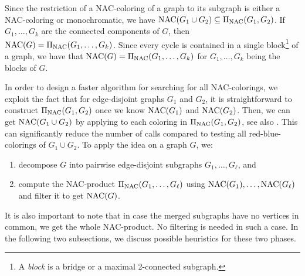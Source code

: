
Since the restriction of a NAC-coloring of a graph
to its subgraph is either a NAC-coloring or monochromatic,
we have $\operatorname{NAC}(G_{1} \cup G_{2}) \subseteq \operatorname{\Pi_{\operatorname{NAC}}}(G_{1}, G_{2})$.
If $G_1, \dots, G_k$ are the connected components of $G$,
then $\operatorname{NAC}(G) = \operatorname{\Pi_{\operatorname{NAC}}}(G_1,\ldots, G_k)$.
Since every cycle is contained in a single
block\footnote{A \emph{block} is a bridge or a maximal 2-connected subgraph.}
of a graph, we have that $\operatorname{NAC}(G) = \operatorname{\Pi_{\operatorname{NAC}}}(G_1,\ldots, G_k)$
for $G_1,\ldots, G_k$ being the blocks of $G$.

In order to design a faster algorithm for searching for all NAC-colorings,
we exploit the fact that for edge-disjoint graphs $G_1$ and $G_2$,
it is straightforward to construct $\operatorname{\Pi_{\operatorname{NAC}}}(G_{1}, G_{2})$ once we know $\operatorname{NAC}(G_1)$ and $\operatorname{NAC}(G_2)$.
Then, we can get $\operatorname{NAC}(G_{1} \cup G_{2})$ by applying \IsNACColoring{}
to each coloring in $\operatorname{\Pi_{\operatorname{NAC}}}(G_{1}, G_{2})$, see also .
This can significantly reduce the number of \IsNACColoring{} calls
compared to testing all red-blue-colorings of $G_{1} \cup G_{2}$.
To apply the idea on a graph $G$, we:
%
\begin{enumerate}
	\item decompose $G$ into pairwise edge-disjoint subgraphs $G_1, \ldots, G_\ell$, and
	\item compute the NAC-product $\operatorname{\Pi_{\operatorname{NAC}}}(G_1, \dots, G_\ell)$ using $\operatorname{NAC}(G_1), \ldots, \operatorname{NAC}(G_\ell)$
	      and filter it to get $\operatorname{NAC}(G)$.
\end{enumerate}
%
It is also important to note that in case the merged subgraphs
have no vertices in common, we get the whole NAC-product.
No filtering is needed in such a case.
%
In the following two subsections, we discuss possible heuristics
for these two phases.

